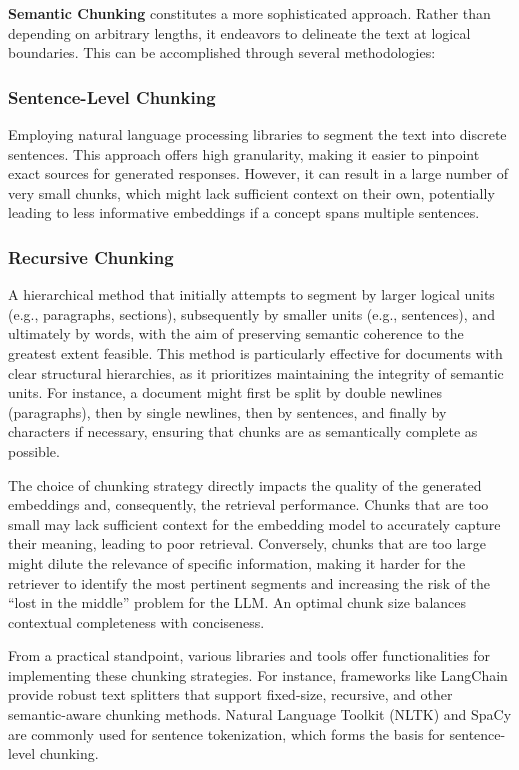 \textbf{Semantic Chunking} constitutes a more sophisticated approach. Rather than depending on arbitrary lengths, it endeavors to delineate the text at logical boundaries. This can be accomplished through several methodologies:

\subsubsection{Sentence-Level Chunking}
Employing natural language processing libraries to segment the text into discrete sentences. This approach offers high granularity, making it easier to pinpoint exact sources for generated responses. However, it can result in a large number of very small chunks, which might lack sufficient context on their own, potentially leading to less informative embeddings if a concept spans multiple sentences.

\subsubsection{Recursive Chunking}
A hierarchical method that initially attempts to segment by larger logical units (e.g., paragraphs, sections), subsequently by smaller units (e.g., sentences), and ultimately by words, with the aim of preserving semantic coherence to the greatest extent feasible. This method is particularly effective for documents with clear structural hierarchies, as it prioritizes maintaining the integrity of semantic units. For instance, a document might first be split by double newlines (paragraphs), then by single newlines, then by sentences, and finally by characters if necessary, ensuring that chunks are as semantically complete as possible.

The choice of chunking strategy directly impacts the quality of the generated embeddings and, consequently, the retrieval performance. Chunks that are too small may lack sufficient context for the embedding model to accurately capture their meaning, leading to poor retrieval. Conversely, chunks that are too large might dilute the relevance of specific information, making it harder for the retriever to identify the most pertinent segments and increasing the risk of the \enquote{lost in the middle} problem for the LLM. An optimal chunk size balances contextual completeness with conciseness.

From a practical standpoint, various libraries and tools offer functionalities for implementing these chunking strategies. For instance, frameworks like LangChain \autocite{langchain} provide robust text splitters that support fixed-size, recursive, and other semantic-aware chunking methods. Natural Language Toolkit (NLTK) \autocite{loper2002nltknaturallanguagetoolkit} and SpaCy \autocite{honnibal2020spacy} are commonly used for sentence tokenization, which forms the basis for sentence-level chunking.

